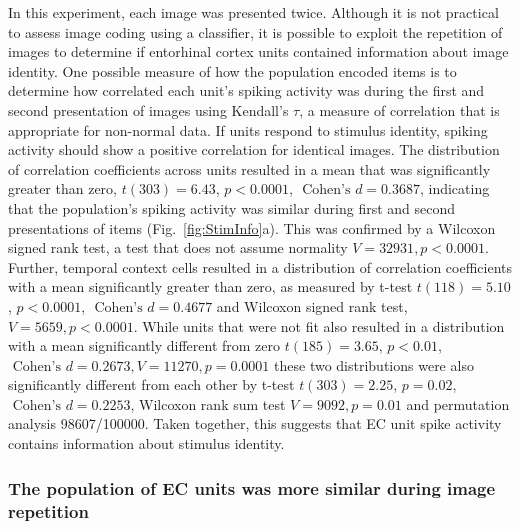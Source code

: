 \documentclass{apa}
\begin{document}
In this experiment, each image was presented twice.  Although it is not
practical to assess image coding using a classifier, it is possible to exploit
the repetition of images to determine if entorhinal cortex units contained
information about image identity. 
One possible measure of how the population encoded items 
is to determine how correlated each unit's spiking activity was during the first and
second presentation of images using Kendall's $\tau$, a measure of correlation
that is appropriate for non-normal data.
If units respond to stimulus identity, spiking activity should show a positive correlation
for identical images.
The distribution of correlation coefficients across
units resulted in a mean that was significantly 
greater than zero, $t(303)=6.43$, $p <0.0001$,
$\text{ Cohen's } d = 0.3687$, indicating that the 
population's spiking activity was
similar during first and second presentations of items
(Fig.~\ref{fig:StimInfo}a). This was confirmed by a Wilcoxon signed rank
test, a test that does not assume normality $V = 32931, p <0.0001$.
Further, temporal context cells resulted in
a distribution of correlation coefficients with a mean significantly greater
than zero, as measured by t-test $t(118)=5.10$, $p <0.0001$, $\text{ Cohen's } d = 0.4677$
and Wilcoxon signed rank test, $V = 5659, p <0.0001$.
 While units that were not fit also resulted in a distribution with a mean
significantly different from zero $t(185)=3.65$, $p <0.01$,$\text{ Cohen's } d
= 0.2673, V = 11270, p = 0.0001$ these two distributions were also significantly
different from each other by t-test $t(303)=2.25$, $p =0.02$,$\text{ Cohen's } d = 0.2253$,
Wilcoxon rank sum test $V = 9092, p = 0.01$
and permutation analysis 98607/100000. 
Taken together, this suggests that EC unit spike activity
contains information about stimulus identity.


\subsubsection{The population of EC units was more similar during image repetition}
\end{document}
